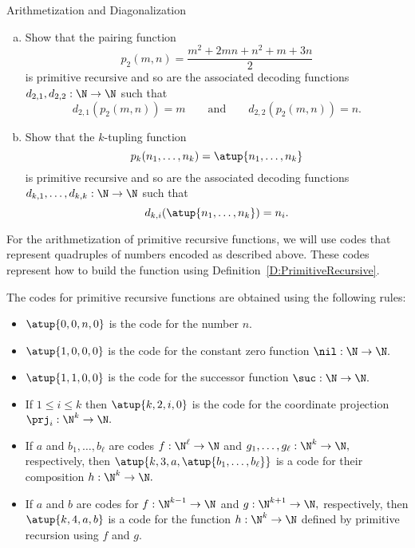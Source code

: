 \begin{unit}{Arithmetization and Diagonalization}
\begin{problem}\mbox{}
\begin{enumerate}[(a)]
\item Show that the pairing function \[p_2(m,n) = \frac{m^2+2mn+n^2+m+3n}{2}\] is primitive recursive and so are the associated decoding functions \(d_{2,1},d_{2,2}:\N\to\N\) such that \[d_{2,1}(p_2(m,n)) = m \qquad\text{and}\qquad d_{2,2}(p_2(m,n)) = n.\]
\item Show that the \(k\)-tupling function \[p_k(n_1,\dots,n_k) = \atup{n_1,\dots,n_k}\] is primitive recursive and so are the associated decoding functions \(d_{k,1},\dots,d_{k,k}:\N\to\N\) such that \[d_{k,i}(\atup{n_1,\dots,n_k}) = n_i.\]
\end{enumerate}
\end{problem}

For the arithmetization of primitive recursive functions, we will use codes that represent quadruples of numbers encoded as described above.
These codes represent how to build the function using Definition~\ref{D:PrimitiveRecursive}.

\begin{definition}
  The codes for primitive recursive functions are obtained using the following rules:
  \begin{itemize}
  \item {}
    \(\atup{0,0,n,0}\) is the code for the number \(n.\)
  \item \(\atup{1,0,0,0}\) is the code for the constant zero function \(\nil:\N\to\N.\)
  \item \(\atup{1,1,0,0}\) is the code for the successor function \(\suc:\N\to\N.\)
  \item If \(1 \leq i \leq k\) then \(\atup{k,2,i,0}\) is the code for the coordinate projection \(\prj_i:\N^k\to\N.\)
  \item If \(a\) and \(b_1,\dots,b_\ell\) are codes \(f:\N^\ell\to\N\) and \(g_1,\dots,g_\ell:\N^k\to\N,\) respectively, then \(\atup{k,3,a,\atup{b_1,\dots,b_\ell}}\) is a code for their composition \(h:\N^k\to\N.\)
  \item If \(a\) and \(b\) are codes for \(f:\N^{k-1}\to\N\) and \(g:\N^{k+1}\to\N,\) respectively, then \(\atup{k,4,a,b}\) is a code for the function \(h:\N^k\to\N\) defined by primitive recursion using \(f\) and \(g.\)
  \end{itemize}
\end{definition}


\end{unit}
